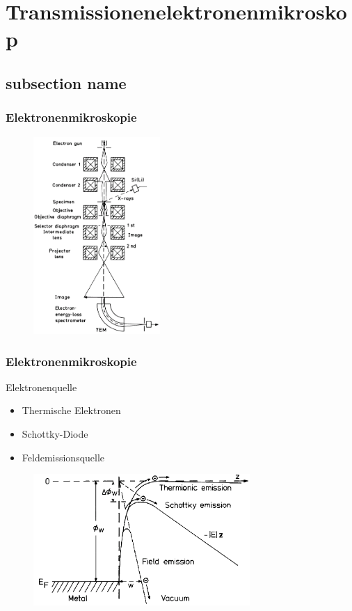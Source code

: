 \section[TEM]{Transmissionenelektronenmikroskop} %
\label{sec:tem}
\subsection*{subsection name} %
\label{sub:subsection_name}

\begin{frame}
	\frametitle{Elektronenmikroskopie}
	\begin{figure}
		\includegraphics[height = 7.5cm]{pic/tem.png}
	\end{figure}
\end{frame}
\begin{frame}
	\frametitle{Elektronenmikroskopie}
	\begin{block}{Elektronenquelle}
		\begin{itemize}
			\item Thermische Elektronen
			\item Schottky-Diode
			\item Feldemissionsquelle
		\end{itemize}
	\end{block}
	\begin{figure}
		\includegraphics[height = 5cm]{pic/emission.png}
	\end{figure}
\end{frame}

